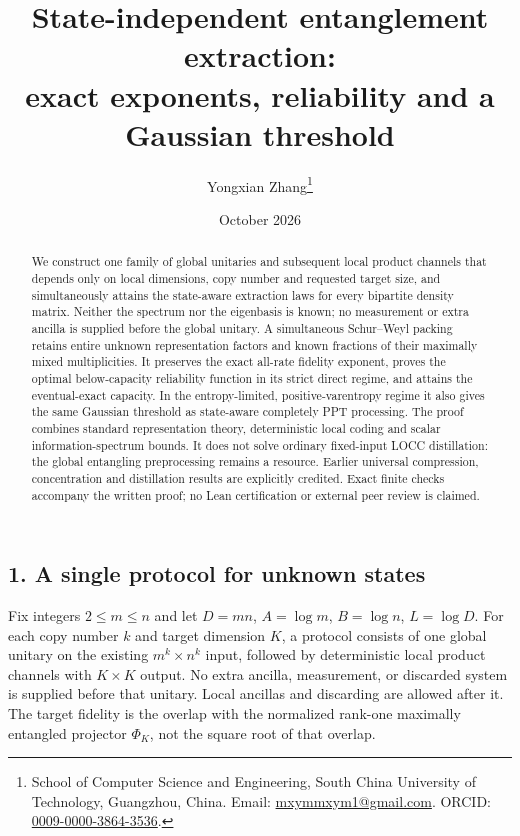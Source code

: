 \documentclass[11pt]{article}
\title{State-independent entanglement extraction:\\exact exponents, reliability and a Gaussian threshold}
\author{Yongxian Zhang\thanks{School of Computer Science and Engineering, South China University of Technology, Guangzhou, China. Email: \href{mailto:mxymmxym1@gmail.com}{mxymmxym1@gmail.com}. ORCID: \href{https://orcid.org/0009-0000-3864-3536}{0009-0000-3864-3536}.}}
\date{October 2026}
\begin{document}
\maketitle
\begin{abstract}
We construct one family of global unitaries and subsequent local product channels that depends only on local dimensions, copy number and requested target size, and simultaneously attains the state-aware extraction laws for every bipartite density matrix. Neither the spectrum nor the eigenbasis is known; no measurement or extra ancilla is supplied before the global unitary. A simultaneous Schur--Weyl packing retains entire unknown representation factors and known fractions of their maximally mixed multiplicities. It preserves the exact all-rate fidelity exponent, proves the optimal below-capacity reliability function in its strict direct regime, and attains the eventual-exact capacity. In the entropy-limited, positive-varentropy regime it also gives the same Gaussian threshold as state-aware completely PPT processing. The proof combines standard representation theory, deterministic local coding and scalar information-spectrum bounds. It does not solve ordinary fixed-input LOCC distillation: the global entangling preprocessing remains a resource. Earlier universal compression, concentration and distillation results are explicitly credited. Exact finite checks accompany the written proof; no Lean certification or external peer review is claimed.
\end{abstract}

\hypertarget{a-single-protocol-for-unknown-states}{%
\subsection{1. A single protocol for unknown states}\label{a-single-protocol-for-unknown-states}}

Fix integers \(2\le m\le n\) and let \(D=mn\), \(A=\log m\), \(B=\log n\), \(L=\log D\). For each copy number \(k\) and target dimension \(K\), a protocol consists of one global unitary on the existing \(m^k\times n^k\) input, followed by deterministic local product channels with \(K\times K\) output. No extra ancilla, measurement, or discarded system is supplied before that unitary. Local ancillas and discarding are allowed after it. The target fidelity is the overlap with the normalized rank-one maximally entangled projector \(\Phi_K\), not the square root of that overlap.
\end{document}
